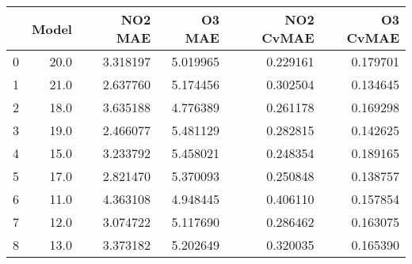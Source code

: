 \begin{tabular}{lrrrrr}
\toprule
{} &  Model &   NO2 MAE &    O3 MAE &  NO2 CvMAE &  O3 CvMAE \\
\midrule
0 &   20.0 &  3.318197 &  5.019965 &   0.229161 &  0.179701 \\
1 &   21.0 &  2.637760 &  5.174456 &   0.302504 &  0.134645 \\
2 &   18.0 &  3.635188 &  4.776389 &   0.261178 &  0.169298 \\
3 &   19.0 &  2.466077 &  5.481129 &   0.282815 &  0.142625 \\
4 &   15.0 &  3.233792 &  5.458021 &   0.248354 &  0.189165 \\
5 &   17.0 &  2.821470 &  5.370093 &   0.250848 &  0.138757 \\
6 &   11.0 &  4.363108 &  4.948445 &   0.406110 &  0.157854 \\
7 &   12.0 &  3.074722 &  5.117690 &   0.286462 &  0.163075 \\
8 &   13.0 &  3.373182 &  5.202649 &   0.320035 &  0.165390 \\
\bottomrule
\end{tabular}
